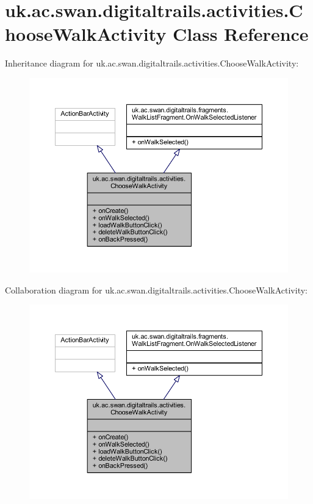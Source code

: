 \hypertarget{classuk_1_1ac_1_1swan_1_1digitaltrails_1_1activities_1_1_choose_walk_activity}{\section{uk.\+ac.\+swan.\+digitaltrails.\+activities.\+Choose\+Walk\+Activity Class Reference}
\label{classuk_1_1ac_1_1swan_1_1digitaltrails_1_1activities_1_1_choose_walk_activity}
}


Inheritance diagram for uk.\+ac.\+swan.\+digitaltrails.\+activities.\+Choose\+Walk\+Activity\+:
\nopagebreak
\begin{figure}[H]
\begin{center}
\leavevmode
\includegraphics[width=350pt]{classuk_1_1ac_1_1swan_1_1digitaltrails_1_1activities_1_1_choose_walk_activity__inherit__graph}
\end{center}
\end{figure}


Collaboration diagram for uk.\+ac.\+swan.\+digitaltrails.\+activities.\+Choose\+Walk\+Activity\+:
\nopagebreak
\begin{figure}[H]
\begin{center}
\leavevmode
\includegraphics[width=350pt]{classuk_1_1ac_1_1swan_1_1digitaltrails_1_1activities_1_1_choose_walk_activity__coll__graph}
\end{center}
\end{figure}
